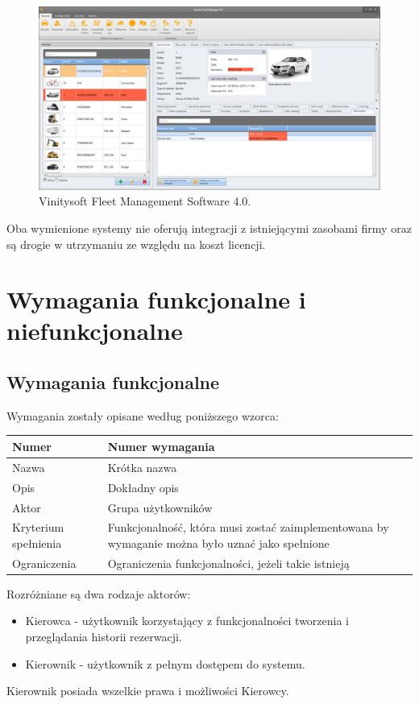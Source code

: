\documentclass[eng,printmode,openany]{mgr}
\begin{document}
	\begin{figure}[H]
		\centering
		\includegraphics[width=\textwidth]{images/vinitysoft.png}
		\caption{Vinitysoft Fleet Management Software 4.0.}
	\end{figure}
	
	Oba wymienione systemy nie oferują integracji z istniejącymi zasobami firmy oraz są drogie w utrzymaniu ze względu na koszt licencji.
	\newpage
	\chapter{Wymagania funkcjonalne i niefunkcjonalne}
	\section{Wymagania funkcjonalne}
	Wymagania zostały opisane według poniższego wzorca:
	\begin{table}[H]
		\begin{tabularx}{\textwidth}{|l|X|}
			\hline
			Numer                & Numer wymagania \\ \hline
			Nazwa                & Krótka nazwa\\ \hline
			Opis                 & Dokładny opis\\ \hline
			Aktor                & Grupa użytkowników\\ \hline
			Kryterium spełnienia & Funkcjonalność, która musi zostać zaimplementowana by wymaganie można było uznać jako spełnione\\ \hline
			Ograniczenia         & Ograniczenia funkcjonalności, jeżeli takie istnieją\\ \hline
		\end{tabularx}
	\end{table}
	Rozróżniane są dwa rodzaje aktorów:
	\begin{itemize}
		\item Kierowca - użytkownik korzystający z funkcjonalności tworzenia i przeglądania historii rezerwacji.
		\item Kierownik - użytkownik z pełnym dostępem do systemu.
	\end{itemize}
	Kierownik posiada wszelkie prawa i możliwości Kierowcy.
	
\end{document}
